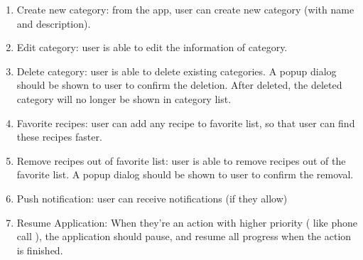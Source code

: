 \documentclass{article}
\begin{document}
\begin{enumerate}
        \item Create new category: from the app, user can create new category (with name and description).
        \item Edit category: user is able to edit the information of category.
        \item Delete category: user is able to delete existing categories. A popup dialog should be shown to user to confirm the deletion. After deleted, the deleted category will no longer be shown in category list.
        \item Favorite recipes: user can add any recipe to favorite list, so that user can find these recipes faster.
        \item Remove recipes out of favorite list: user is able to remove recipes out of the favorite list. A popup dialog should be shown to user to confirm the removal.
        \item Push notification: user can receive notifications (if they allow)
        \item Resume Application: When they're an action with higher priority ( like phone call ), the application should pause, and resume all progress when the action is finished.
    \end{enumerate}
\end{document}
